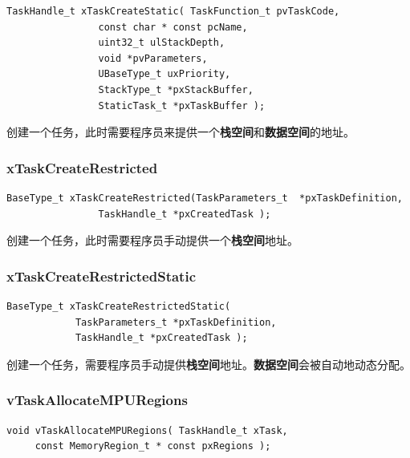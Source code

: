 \documentclass[12pt, a4paper]{article}
\begin{document}
\begin{lstlisting}[language={[ANSI]C},keywordstyle=\color{blue!70},commentstyle=\color{red!50!green!50!blue!50},frame=shadowbox, rulesepcolor=\color{red!20!green!20!blue!20}]
TaskHandle_t xTaskCreateStatic( TaskFunction_t pvTaskCode,
				const char * const pcName,
				uint32_t ulStackDepth,
				void *pvParameters,
				UBaseType_t uxPriority,
				StackType_t *pxStackBuffer,
				StaticTask_t *pxTaskBuffer );
\end{lstlisting}
创建一个任务，此时需要程序员来提供一个\textbf{栈空间}和\textbf{数据空间}的地址。

\subsubsection {xTaskCreateRestricted}
\begin{lstlisting}[language={[ANSI]C},keywordstyle=\color{blue!70},commentstyle=\color{red!50!green!50!blue!50},frame=shadowbox, rulesepcolor=\color{red!20!green!20!blue!20}]
BaseType_t xTaskCreateRestricted(TaskParameters_t  *pxTaskDefinition,
				TaskHandle_t *pxCreatedTask );
\end{lstlisting}

创建一个任务，此时需要程序员手动提供一个\textbf{栈空间}地址。

\subsubsection {xTaskCreateRestrictedStatic}

\begin{lstlisting}[language={[ANSI]C},keywordstyle=\color{blue!70},commentstyle=\color{red!50!green!50!blue!50},frame=shadowbox, rulesepcolor=\color{red!20!green!20!blue!20}]
 BaseType_t xTaskCreateRestrictedStatic( 
 			TaskParameters_t *pxTaskDefinition, 
 			TaskHandle_t *pxCreatedTask );
\end{lstlisting}

创建一个任务，需要程序员手动提供\textbf{栈空间}地址。\textbf{数据空间}会被自动地动态分配。

\subsubsection {vTaskAllocateMPURegions}

\begin{lstlisting}[language={[ANSI]C},keywordstyle=\color{blue!70},commentstyle=\color{red!50!green!50!blue!50},frame=shadowbox, rulesepcolor=\color{red!20!green!20!blue!20}]
void vTaskAllocateMPURegions( TaskHandle_t xTask, 
	 const MemoryRegion_t * const pxRegions );
\end{lstlisting}
\end{document}

